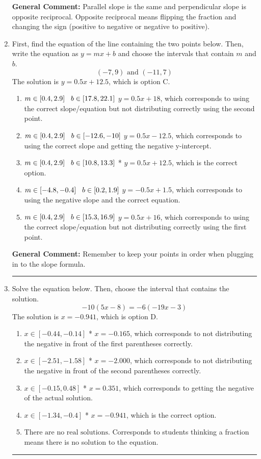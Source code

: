 \documentclass{extbook}[14pt]
\newcommand{\litem}[1]{\item #1

\rule{\textwidth}{0.4pt}}
\begin{document}
\begin{enumerate}
{\textbf{General Comment:} Parallel slope is the same and perpendicular slope is opposite reciprocal. Opposite reciprocal means flipping the fraction and changing the sign (positive to negative or negative to positive).
}
\litem{
First, find the equation of the line containing the two points below. Then, write the equation as $ y=mx+b $ and choose the intervals that contain $m$ and $b$.
\[ (-7, 9) \text{ and } (-11, 7) \]
The solution is \( y = 0.5x + 12.5 \), which is option C.\begin{enumerate}[label=\Alph*.]
\item \( m \in [0.4, 2.9] \hspace*{3mm} b \in [17.8, 22.1] \)
 $y = 0.5x + 18$, which corresponds to using the correct slope/equation but not distributing correctly using the second point.
\item \( m \in [0.4, 2.9] \hspace*{3mm} b \in [-12.6, -10] \)
 $y = 0.5x -12.5$, which corresponds to using the correct slope and getting the negative y-intercept.
\item \( m \in [0.4, 2.9] \hspace*{3mm} b \in [10.8, 13.3] \)
* $y = 0.5x + 12.5$, which is the correct option.
\item \( m \in [-4.8, -0.4] \hspace*{3mm} b \in [0.2, 1.9] \)
 $y = -0.5x + 1.5$, which corresponds to using the negative slope and the correct equation.
\item \( m \in [0.4, 2.9] \hspace*{3mm} b \in [15.3, 16.9] \)
 $y = 0.5x + 16$, which corresponds to using the correct slope/equation but not distributing correctly using the first point.
\end{enumerate}

\textbf{General Comment:} Remember to keep your points in order when plugging in to the slope formula.
}

\litem{
Solve the equation below. Then, choose the interval that contains the solution.
\[ -10(5x -8) = -6(-19x -3) \]
The solution is \( x = -0.941 \), which is option D.\begin{enumerate}[label=\Alph*.]
\item \( x \in [-0.44, -0.14] \)
* $x = -0.165$, which corresponds to not distributing the negative in front of the first parentheses correctly.
\item \( x \in [-2.51, -1.58] \)
* $x = -2.000$, which corresponds to not distributing the negative in front of the second parentheses correctly.
\item \( x \in [-0.15, 0.48] \)
* $x = 0.351$, which corresponds to getting the negative of the actual solution.
\item \( x \in [-1.34, -0.4] \)
* $x = -0.941$, which is the correct option.
\item \( \text{There are no real solutions.} \)
Corresponds to students thinking a fraction means there is no solution to the equation.
\end{enumerate}

}
\end{enumerate}
\end{document}
